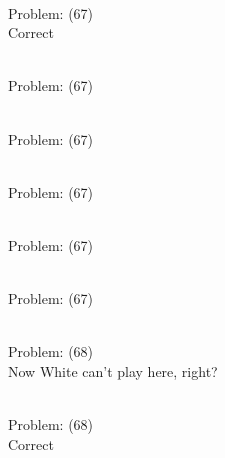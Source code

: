 \documentclass[11pt]{article}
\begin{document}
\begin{minipage}[t]{0.5\textwidth}
  {\centering
  
\\
Problem: (67)\\
Correct\\
  }
\end{minipage}
\begin{minipage}[t]{0.5\textwidth}
  {\centering
  
\\
Problem: (67)\\
  }
\end{minipage}
\begin{minipage}[t]{0.5\textwidth}
  {\centering
  
\\
Problem: (67)\\
  }
\end{minipage}
\begin{minipage}[t]{0.5\textwidth}
  {\centering
  
\\
Problem: (67)\\
  }
\end{minipage}
\begin{minipage}[t]{0.5\textwidth}
  {\centering
  
\\
Problem: (67)\\
  }
\end{minipage}
\begin{minipage}[t]{0.5\textwidth}
  {\centering
  
\\
Problem: (67)\\
  }
\end{minipage}
\begin{minipage}[t]{0.5\textwidth}
  {\centering
  
\\
Problem: (68)\\
Now White can't play here, right?\\
  }
\end{minipage}
\begin{minipage}[t]{0.5\textwidth}
  {\centering
  
\\
Problem: (68)\\
Correct\\
  }
\end{minipage}
\end{document}
